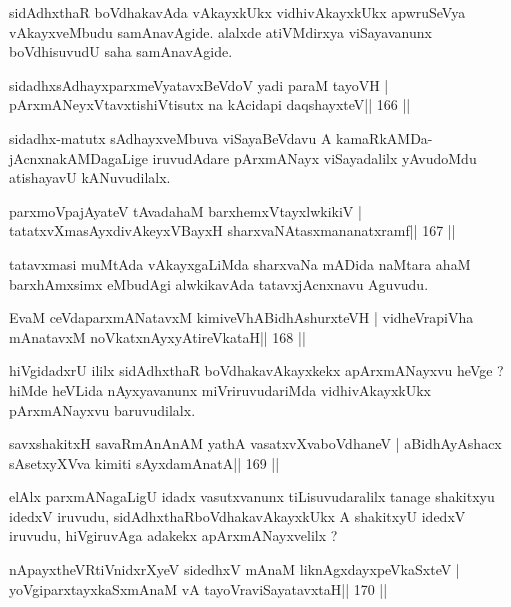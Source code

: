 \begin{artha}
sidAdhxthaR boVdhakavAda vAkayxkUkx vidhivAkayxkUkx apwruSeVya vAkayxveMbudu samAnavAgide. alalxde atiVMdirxya viSayavanunx boVdhisuvudU saha samAna\-vAgide.
\end{artha}

\begin{shl}
sidadhxsAdhayxparxmeVyatavxBeVdoV yadi paraM tayoVH |
pArxmANeyxVtavxtishiVtisutx na kAcidapi daqshayxteV\hfill || 166 ||
\end{shl}

\begin{artha}
sidadhx-matutx sAdhayxveMbuva viSayaBeVdavu A kamaRkAMDa-jAcnxnakAMDagaLige iruvudAdare pArxmANayx viSayadalilx yAvudoMdu atishayavU kANuvudilalx.
\end{artha}

\begin{shl}
parxmoVpajAyateV tAvadahaM barxhemxVtayxlwkikiV |
tatatxvXmasAyxdivAkeyxVBayxH sharxvaNAtasxmananatxramf\hfill || 167 ||
\end{shl}

\begin{artha}
tatavxmasi muMtAda vAkayxgaLiMda sharxvaNa mADida naMtara ahaM barxhAmxsimx eMbudAgi  alwkikavAda tatavxjAcnxnavu Aguvudu.
\end{artha}

\begin{shl}
EvaM ceVdaparxmANatavxM kimiveVhABidhAshurxteVH |
vidheVrapiVha mAnatavxM noVkatxnAyxyAtireVkataH\hfill || 168 ||
\end{shl}

\begin{artha}
hiVgidadxrU ililx sidAdhxthaR boVdhakavAkayxkekx apArxmANayxvu heVge ? hiMde heVLida nAyxyavanunx miVriruvudariMda vidhivAkayxkUkx pArxmANayxvu baruvudilalx.
\end{artha}

\begin{shl}
savxshakitxH savaRmAnAnAM yathA vasatxvXvaboVdhaneV |
aBidhAyAshacx sA\s setxyXVva kimiti sAyxdamAnatA\hfill || 169 ||
\end{shl}

\begin{artha}
elAlx parxmANagaLigU idadx vasutxvanunx tiLisuvudaralilx tanage shakitxyu idedxV iruvudu, sidAdhxthaRboVdhakavAkayxkUkx A shakitxyU idedxV iruvudu, hiVgiruvAga adakekx apArxmANayxvelilx ? 
\end{artha}

\begin{shl}
nApayxtheVR\s tiVnidxrXyeV sidedhxV mAnaM liknAgxdayxpeVkaSxteV |
yoVgiparxtayxkaSxmAnaM vA tayoVraviSayatavxtaH\hfill || 170 ||
\end{shl}

